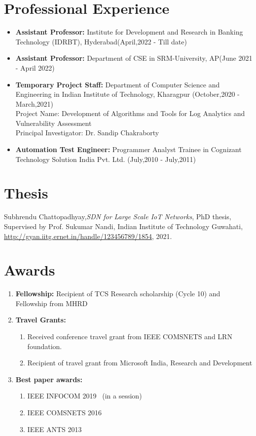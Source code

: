 \documentclass{article}
\begin{document}
\section{Professional Experience}
	\begin{itemize}
		\item{\bf Assistant Professor:} Institute for Development and Research in Banking Technology (IDRBT), Hyderabad(April,2022 - Till date)
		\item{\bf Assistant Professor:} Department of CSE in SRM-University, AP(June 2021 - April 2022)
		\item{\bf Temporary Project Staff:} Department of Computer Science and Engineering in Indian Institute of Technology, Kharagpur (October,2020 - March,2021)\\
	Project Name: Development of Algorithms and Tools for Log Analytics  and Vulnerability Assessment \\
	Principal Investigator: Dr. Sandip Chakraborty
		\item{\bf Automation Test Engineer:} Programmer Analyst Trainee in Cognizant Technology Solution India Pvt. Ltd. (July,2010 - July,2011)
	\end{itemize}

\section{Thesis}
Subhrendu Chattopadhyay,{\em SDN for Large Scale IoT Networks}, PhD thesis, Supervised by Prof. Sukumar Nandi, Indian Institute of Technology Guwahati, \url{http://gyan.iitg.ernet.in/handle/123456789/1854}, 2021.
\section{Awards}
	\begin{enumerate}
		\item{\bf Fellowship:} Recipient of TCS Research scholarship (Cycle 10) and Fellowship from MHRD
		\item {\bf Travel Grants:} 
			\begin{enumerate}
				\item Received conference travel grant from IEEE COMSNETS and LRN foundation.
				\item Recipient of travel grant from Microsoft India, Research and Development
			\end{enumerate}
		\item {\bf Best paper awards:} 
			\begin{enumerate}
				\item IEEE INFOCOM 2019~\cite{chattopadhyay2018aloe} (in a session)
				\item IEEE COMSNETS 2016~\cite{chakraborty2016es2}
				\item IEEE ANTS 2013~\cite{chakraborty2013surpassing}
			\end{enumerate}
	\end{enumerate}
\end{document}
